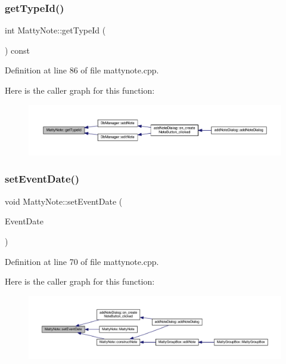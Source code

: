 \subsubsection{\texorpdfstring{get\+Type\+Id()}{getTypeId()}}
{\footnotesize\ttfamily int Matty\+Note\+::get\+Type\+Id (\begin{DoxyParamCaption}{ }\end{DoxyParamCaption}) const}



Definition at line 86 of file mattynote.\+cpp.

Here is the caller graph for this function\+:
\nopagebreak
\begin{figure}[H]
\begin{center}
\leavevmode
\includegraphics[width=350pt]{classMattyNote_ad12d2758099fe96bf596ef6a7ab4abc2_icgraph}
\end{center}
\end{figure}
\hypertarget{classMattyNote_a70676b1ab215b873c9451a82cc417684}{}\label{classMattyNote_a70676b1ab215b873c9451a82cc417684} 
\subsubsection{\texorpdfstring{set\+Event\+Date()}{setEventDate()}}
{\footnotesize\ttfamily void Matty\+Note\+::set\+Event\+Date (\begin{DoxyParamCaption}\item[{const Q\+String \&}]{Event\+Date }\end{DoxyParamCaption})}



Definition at line 70 of file mattynote.\+cpp.

Here is the caller graph for this function\+:
\nopagebreak
\begin{figure}[H]
\begin{center}
\leavevmode
\includegraphics[width=350pt]{classMattyNote_a70676b1ab215b873c9451a82cc417684_icgraph}
\end{center}
\end{figure}
\hypertarget{classMattyNote_aaeba8670420ab9ad0fb8be660845e0ba}{}\label{classMattyNote_aaeba8670420ab9ad0fb8be660845e0ba} 
